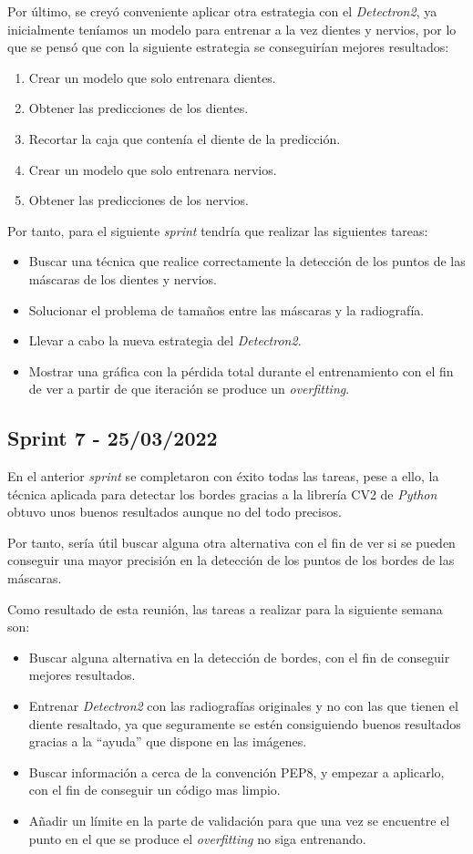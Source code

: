 Por último, se creyó conveniente aplicar otra estrategia con el \emph{Detectron2}, ya inicialmente teníamos un modelo para entrenar a la vez dientes y nervios, por lo que se pensó que con la siguiente estrategia se conseguirían mejores resultados:
\begin{enumerate}
    \item Crear un modelo que solo entrenara dientes.
    \item Obtener las predicciones de los dientes.
    \item Recortar la caja que contenía el diente de la predicción.
    \item Crear un modelo que solo entrenara nervios.
    \item Obtener las predicciones de los nervios.
\end{enumerate}
Por tanto, para el siguiente \emph{sprint} tendría que realizar las siguientes tareas:
\begin{itemize}
    \item Buscar una técnica que realice correctamente la detección de los puntos de las máscaras de los dientes y nervios.
    \item Solucionar el problema de tamaños entre las máscaras y la radiografía.
    \item Llevar a cabo la nueva estrategia del \emph{Detectron2}.
    \item Mostrar una gráfica con la pérdida total durante el entrenamiento con el fin de ver a partir de que iteración se produce un \emph{overfitting}.
\end{itemize}
\subsection{Sprint 7 - 25/03/2022}
En el anterior \emph{sprint} se completaron con éxito todas las tareas, pese a ello, la técnica aplicada para detectar los bordes gracias a la librería CV2 de \emph{Python} obtuvo unos buenos resultados aunque no del todo precisos.

Por tanto, sería útil buscar alguna otra alternativa con el fin de ver si se pueden conseguir una mayor precisión en la detección de los puntos de los bordes de las máscaras.

Como resultado de esta reunión, las tareas a realizar para la siguiente semana son:
\begin{itemize}
    \item Buscar alguna alternativa en la detección de bordes, con el fin de conseguir mejores resultados.
    \item Entrenar \emph{Detectron2} con las radiografías originales y no con las que tienen el diente resaltado, ya que seguramente se estén consiguiendo buenos resultados gracias a la ``ayuda'' que dispone en las imágenes.
    \item Buscar información a cerca de la convención PEP8, y empezar a aplicarlo, con el fin de conseguir un código mas limpio.
    \item Añadir un límite en la parte de validación para que una vez se encuentre el punto en el que se produce el \emph{overfitting} no siga entrenando.  
\end{itemize}
